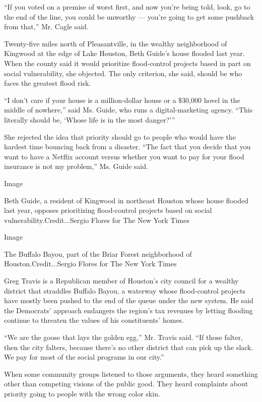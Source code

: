 ``If you voted on a premise of worst first, and now you're being told,
look, go to the end of the line, you could be unworthy --- you're going
to get some pushback from that,'' Mr. Cagle said.

Twenty-five miles north of Pleasantville, in the wealthy neighborhood of
Kingwood at the edge of Lake Houston, Beth Guide's house flooded last
year. When the county said it would prioritize flood-control projects
based in part on social vulnerability, she objected. The only criterion,
she said, should be who faces the greatest flood risk.

``I don't care if your house is a million-dollar house or a \$30,000
hovel in the middle of nowhere,'' said Ms. Guide, who runs a
digital-marketing agency. ``This literally should be, `Whose life is in
the most danger?'''

She rejected the idea that priority should go to people who would have
the hardest time bouncing back from a disaster. ``The fact that you
decide that you want to have a Netflix account versus whether you want
to pay for your flood insurance is not my problem,'' Ms. Guide said.

Image

Beth Guide, a resident of Kingwood in northeast Houston whose house
flooded last year, opposes prioritizing flood-control projects based on
social vulnerability.Credit...Sergio Flores for The New York Times

Image

The Buffalo Bayou, part of the Briar Forest neighborhood of
Houston.Credit...Sergio Flores for The New York Times

Greg Travis is a Republican member of Houston's city council for a
wealthy district that straddles Buffalo Bayou, a waterway whose
flood-control projects have mostly been pushed to the end of the queue
under the new system. He said the Democrats' approach endangers the
region's tax revenues by letting flooding continue to threaten the
values of his constituents' homes.

``We are the goose that lays the golden egg,'' Mr. Travis said. ``If
those falter, then the city falters, because there's no other district
that can pick up the slack. We pay for most of the social programs in
our city.''

When some community groups listened to those arguments, they heard
something other than competing visions of the public good. They heard
complaints about priority going to people with the wrong color skin.

